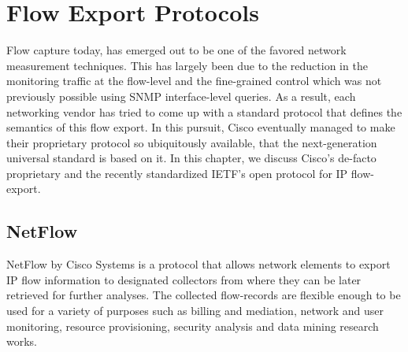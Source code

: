 \chapter{Flow Export Protocols}\label{ch:flow-export-protocols}

Flow capture today, has emerged out to be one of the favored network measurement techniques. This has largely been due to the reduction in the monitoring traffic at the flow-level and the fine-grained control which was not previously possible using \ac{SNMP} interface-level queries. As a result, each networking vendor has tried to come up with a standard protocol that defines the semantics of this flow export. In this pursuit, Cisco eventually managed to make their proprietary protocol so ubiquitously available, that the next-generation universal standard is based on it. In this chapter, we discuss Cisco's de-facto proprietary and the recently standardized \ac{IETF}'s open protocol for \ac{IP} flow-export. 

\section{NetFlow}\label{sec:netflow}
NetFlow \cite{rfc3954} by Cisco Systems is a protocol that allows network elements to export \ac{IP} flow information to designated collectors from where they can be later retrieved for further analyses. The collected flow-records are flexible enough to be used for a variety of purposes such as billing and mediation, network and user monitoring, resource provisioning, security analysis and data mining research works.


